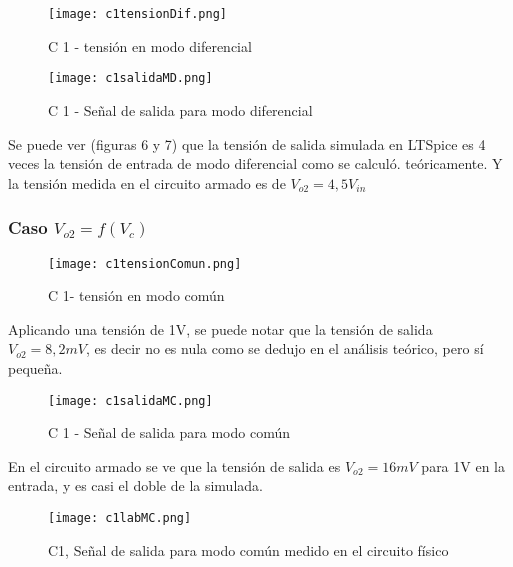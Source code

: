  \begin{figure}[h!]
     \centering
     \texttt{[image: c1tensionDif.png]}    
     \caption{C 1 - tensión en modo diferencial}
     \label{fig:enter-label}
 \end{figure}

\vspace{1em}

\begin{figure}[h!]
    \centering
    \texttt{[image: c1salidaMD.png]}    
    \caption{C 1 - Señal de salida para modo diferencial}
    \label{fig:enter-label}
\end{figure}

Se puede ver (figuras 6 y 7) que la tensión de salida simulada en LTSpice es 4 veces la tensión de entrada de modo diferencial como se calculó.
 teóricamente.
Y la tensión medida en el circuito armado es de $V_{o2} = 4,5V_{in}$

\vspace{1em}

\subsubsection{Caso $V_{o2} = f(V_c)$} 

\begin{figure}[h!]
    \centering
    \texttt{[image: c1tensionComun.png]}    
    \caption{C 1- tensión en modo común}
    \label{fig:enter-label}
\end{figure}

Aplicando una tensión de 1V, se puede notar que la tensión de salida $V_{o2} = 8,2 mV $, es decir no es nula como se dedujo en el análisis teórico, pero sí pequeña.

\begin{figure}[h!]
    \centering
    \texttt{[image: c1salidaMC.png]}    
    \caption{C 1 - Señal de salida para modo común}
    \label{fig:enter-label}
\end{figure}

En el circuito armado se ve que la tensión de salida es $V_{o2} = 16mV $ para 1V en la entrada, y es casi el doble de la simulada.

\begin{figure}[h!]
    \centering
    \texttt{[image: c1labMC.png]}    
    \caption{C1, Señal de salida para modo común medido en el circuito físico}
    \label{fig:enter-label}
\end{figure}

